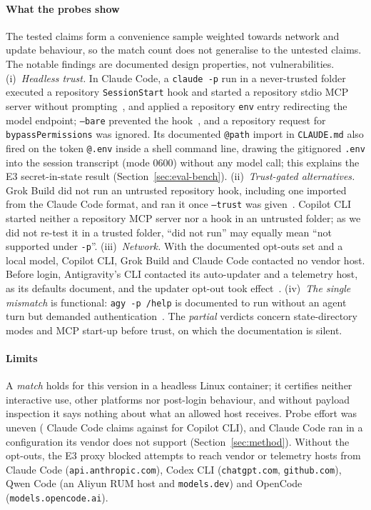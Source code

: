 \paragraph*{What the probes show} The tested claims form a convenience sample weighted towards network and update behaviour, so the match count does not generalise to the untested claims. The notable findings are documented design properties, not vulnerabilities.
(i)~\emph{Headless trust.} In Claude Code, a \texttt{claude -p} run in a never-trusted folder executed a repository \texttt{SessionStart} hook and started a repository stdio MCP server without prompting\evT\evD~\cite{cc_permissions_trust}, and applied a repository \texttt{env} entry redirecting the model endpoint\evT\evD{}; \texttt{--bare} prevented the hook\evT\evD~\cite{cc_headless}, and a repository request for \texttt{bypassPermissions} was ignored\evT\evD{}. Its documented \texttt{@path} import in \texttt{CLAUDE.md} also fired on the token \texttt{@.env} inside a shell command line, drawing the gitignored \texttt{.env} into the session transcript (mode 0600) without any model call\evT\evD{}; this explains the E3 secret-in-state result (Section~\ref{sec:eval-bench}).
(ii)~\emph{Trust-gated alternatives.} Grok Build did not run an untrusted repository hook, including one imported from the Claude Code format, and ran it once \texttt{--trust} was given\evT\evD~\cite{grokbuild_hooks}. Copilot CLI started neither a repository MCP server nor a hook in an untrusted folder\evT\evD{}; as we did not re-test it in a trusted folder, ``did not run'' may equally mean ``not supported under \texttt{-p}''.
(iii)~\emph{Network.} With the documented opt-outs set and a local model, Copilot CLI, Grok Build and Claude Code contacted no vendor host\evT\evD{}. Before login, Antigravity's CLI contacted its auto-updater and a telemetry host, as its defaults document, and the updater opt-out took effect\evT\evD~\cite{ag_settings}.
(iv)~\emph{The single mismatch} is functional: \texttt{agy -p /help} is documented to run without an agent turn but demanded authentication\evT\evD~\cite{ag_cli_headless}. The \emph{partial} verdicts concern state-directory modes and MCP start-up before trust, on which the documentation is silent.

\paragraph*{Limits} A \emph{match} holds for this version in a headless Linux container; it certifies neither interactive use, other platforms nor post-login behaviour, and without payload inspection it says nothing about what an allowed host receives. Probe effort was uneven (\nClaimsTestedClaude{} Claude Code claims against \nClaimsTestedCopilot{} for Copilot CLI), and Claude Code ran in a configuration its vendor does not support (Section~\ref{sec:method}). Without the opt-outs, the E3 proxy blocked attempts to reach vendor or telemetry hosts from Claude Code (\texttt{api.anthropic.com}), Codex CLI (\texttt{chatgpt.com}, \texttt{github.com}), Qwen Code (an Aliyun RUM host and \texttt{models.dev}) and OpenCode (\texttt{models.opencode.ai})\evT{}.
